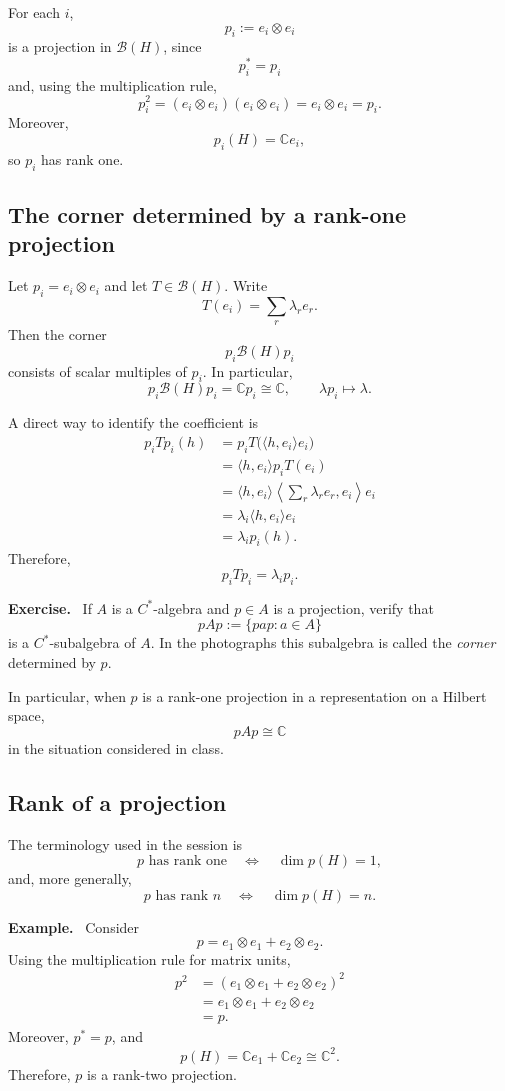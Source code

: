 \documentclass[11pt]{article}
\newcommand{\C}{\mathbb{C}}
\newcommand{\BH}{\mathcal{B}(H)}
\newenvironment{example}{\par\medskip\noindent\textbf{Example.}\ }{\par\medskip}
\newenvironment{exercise}{\par\medskip\noindent\textbf{Exercise.}\ }{\par\medskip}
\begin{document}
For each $i$,
\[
p_i:=e_i\otimes e_i
\]
is a projection in $\BH$, since
\[
p_i^*=p_i
\]
and, using the multiplication rule,
\[
p_i^2=(e_i\otimes e_i)(e_i\otimes e_i)=e_i\otimes e_i=p_i.
\]
Moreover,
\[
p_i(H)=\C e_i,
\]
so $p_i$ has rank one.

\subsection{The corner determined by a rank-one projection}

Let $p_i=e_i\otimes e_i$ and let $T\in\BH$. Write
\[
T(e_i)=\sum_r \lambda_r e_r.
\]
Then the corner
\[
p_i\BH p_i
\]
consists of scalar multiples of $p_i$. In particular,
\[
p_i\BH p_i=\C p_i\cong\C,
\qquad
\lambda p_i\longmapsto \lambda.
\]

A direct way to identify the coefficient is
\begin{align*}
p_iTp_i(h)
 &=p_iT\bigl(\langle h,e_i\rangle e_i\bigr)\\
 &=\langle h,e_i\rangle p_iT(e_i)\\
 &=\langle h,e_i\rangle
   \left\langle \sum_r\lambda_r e_r,e_i\right\rangle e_i\\
 &=\lambda_i\langle h,e_i\rangle e_i\\
 &=\lambda_i p_i(h).
\end{align*}
Therefore,
\[
p_iTp_i=\lambda_i p_i.
\]

\begin{exercise}
If $A$ is a $C^*$-algebra and $p\in A$ is a projection, verify that
\[
pAp:=\{pap:a\in A\}
\]
is a $C^*$-subalgebra of $A$. In the photographs this subalgebra is called the
\emph{corner} determined by $p$.
\end{exercise}

In particular, when $p$ is a rank-one projection in a representation on a Hilbert
space,
\[
pAp\cong\C
\]
in the situation considered in class.

\subsection{Rank of a projection}

The terminology used in the session is
\[
p\text{ has rank one}
\quad\Longleftrightarrow\quad
\dim p(H)=1,
\]
and, more generally,
\[
p\text{ has rank }n
\quad\Longleftrightarrow\quad
\dim p(H)=n.
\]

\begin{example}
Consider
\[
p=e_1\otimes e_1+e_2\otimes e_2.
\]
Using the multiplication rule for matrix units,
\begin{align*}
p^2
 &= (e_1\otimes e_1+e_2\otimes e_2)^2\\
 &=e_1\otimes e_1+e_2\otimes e_2\\
 &=p.
\end{align*}
Moreover, $p^*=p$, and
\[
p(H)=\C e_1+\C e_2\cong\C^2.
\]
Therefore, $p$ is a rank-two projection.
\end{example}
\end{document}
